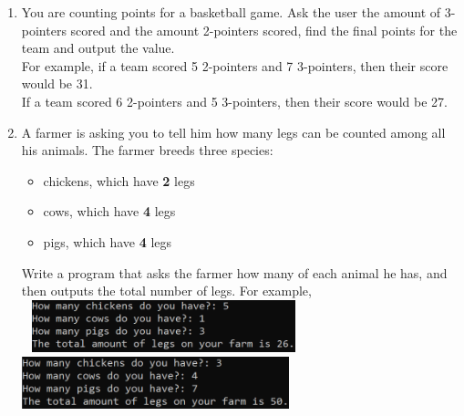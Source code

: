 \documentclass{article}
\begin{document}
\begin{enumerate}
	\item 
		You are counting points for a basketball game. Ask the user the amount of 3-pointers scored 
		and the amount 2-pointers scored, find the final points for the team and output the value.\\
		For example, if a team scored 5 2-pointers and 7 3-pointers, then their score would be 31.\\
		If a team scored 6 2-pointers and 5 3-pointers, then their score would be 27.
	
	
	\item
		A farmer is asking you to tell him how many legs can be counted among all his animals. 
		The farmer breeds three species:
		\begin{itemize}
			\item chickens, which have \textbf{2} legs
			\item cows, which have \textbf{4} legs
			\item pigs, which have \textbf{4} legs
		\end{itemize}
		Write a program that asks the farmer how many of each animal he has, and then outputs the
		total number of legs.  		
		For example, \\ \ \hfill
		\includegraphics[height = 0.6in]{./imgs/animalLegs_ex1.PNG} \hfill
		\includegraphics[height = 0.6in]{./imgs/animalLegs_ex2.PNG} \hfill \
	
	
	
	


		


\end{enumerate}
\end{document}
